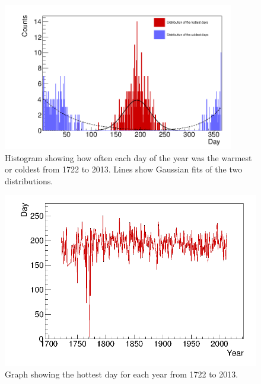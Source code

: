 \documentclass[a4paper]{article}
\begin{document}
\begin{figure}[H]
\begin{center}
\includegraphics[width=0.9\textwidth]{HottestColdest.png}
\caption{Histogram showing how often each day of the year was the warmest or coldest from 1722 to 2013. Lines show Gaussian fits of the two distributions.}
\label{fig:HotColdHist}
\end{center}
\end{figure}

\begin{figure}[H]
\begin{center}
\includegraphics[width=13cm]{graph1DHot.png}
\caption{Graph showing the hottest day for each year from 1722 to 2013.}
\label{fig:HotGraph}
\end{center}
\end{figure}
\end{document}
